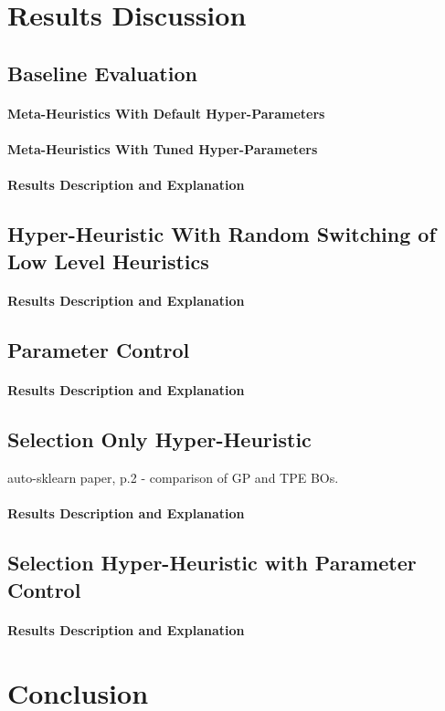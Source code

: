 \section{Results Discussion}

\subsection{Baseline Evaluation}

\paragraph{Meta-Heuristics With Default Hyper-Parameters}

\paragraph{Meta-Heuristics With Tuned Hyper-Parameters}

\paragraph{Results Description and Explanation}


\subsection{Hyper-Heuristic With Random Switching of Low Level Heuristics}

\paragraph{Results Description and Explanation}


\subsection{Parameter Control}

\paragraph{Results Description and Explanation}


\subsection{Selection Only Hyper-Heuristic}
auto-sklearn paper, p.2 - comparison of GP and TPE BOs.

\paragraph{Results Description and Explanation}


\subsection{Selection Hyper-Heuristic with Parameter Control}

\paragraph{Results Description and Explanation}

\section{Conclusion}
